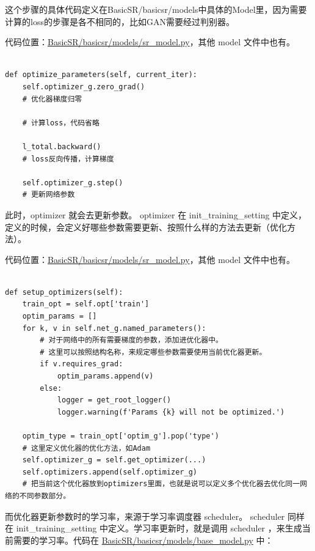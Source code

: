 \documentclass[../main.tex]{subfiles}
\begin{document}
这个步骤的具体代码定义在BasicSR/basicsr/models中具体的Model里，因为需要计算的loss的步骤是各不相同的，比如GAN需要经过判别器。

代码位置：\href{https://github.com/XPixelGroup/BasicSR/blob/master/basicsr/models/sr_model.py}{BasicSR/basicsr/models/sr\_model.py}，其他 model 文件中也有。

\begin{verbatim}

def optimize_parameters(self, current_iter):
    self.optimizer_g.zero_grad()
    # 优化器梯度归零

    # 计算loss，代码省略

    l_total.backward()
    # loss反向传播，计算梯度

    self.optimizer_g.step()
    # 更新网络参数
\end{verbatim}

此时，optimizer 就会去更新参数。 optimizer 在 init\_training\_setting 中定义，定义的时候，会定义好哪些参数需要更新、按照什么样的方法去更新（优化方法）。

代码位置：\href{https://github.com/XPixelGroup/BasicSR/blob/master/basicsr/models/sr_model.py}{BasicSR/basicsr/models/sr\_model.py}，其他 model 文件中也有。

\begin{verbatim}

def setup_optimizers(self):
    train_opt = self.opt['train']
    optim_params = []
    for k, v in self.net_g.named_parameters():
        # 对于网络中的所有需要梯度的参数，添加进优化器中。
        # 这里可以按照结构名称，来规定哪些参数需要使用当前优化器更新。
        if v.requires_grad:
            optim_params.append(v)
        else:
            logger = get_root_logger()
            logger.warning(f'Params {k} will not be optimized.')

    optim_type = train_opt['optim_g'].pop('type')
    # 这里定义优化器的优化方法，如Adam
    self.optimizer_g = self.get_optimizer(...)
    self.optimizers.append(self.optimizer_g)
    # 把当前这个优化器放到optimizers里面，也就是说可以定义多个优化器去优化同一网络的不同参数部分。
\end{verbatim}

而优化器更新参数时的学习率，来源于学习率调度器 scheduler。 scheduler 同样在 init\_training\_setting 中定义。学习率更新时，就是调用 scheduler ，来生成当前需要的学习率。代码在 \href{https://github.com/XPixelGroup/BasicSR/blob/master/basicsr/models/base_model.py}{BasicSR/basicsr/models/base\_model.py} 中：
\end{document}
